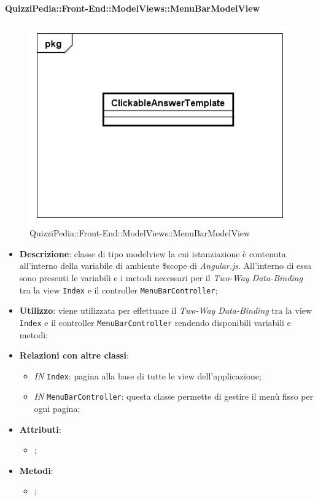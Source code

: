 \paragraph{QuizziPedia::Front-End::ModelViews::MenuBarModelView}

\label{QuizziPedia::Front-End::ModelViews::MenuBarModelView}

\begin{figure}[ht]
	\centering
	\includegraphics[scale=0.5,keepaspectratio]{UML/Classi/Front-End/QuizziPedia_Front-end_Templates_ClickableAnswerTemplate.png}
	\caption{QuizziPedia::Front-End::ModelViews::MenuBarModelView}
\end{figure} \FloatBarrier

\begin{itemize}
	\item \textbf{Descrizione}: classe di tipo modelview la cui istanziazione è contenuta all'interno della variabile di ambiente \$scope di \textit{Angular.js}. All'interno di essa sono presenti le variabili e i metodi necessari per il \textit{Two-Way Data-Binding} tra la view \texttt{Index} e il controller \texttt{MenuBarController};
	\item \textbf{Utilizzo}: viene utilizzata per effettuare il \textit{Two-Way Data-Binding} tra la view \texttt{Index} e il controller \texttt{MenuBarController} rendendo disponibili variabili e metodi;
	\item \textbf{Relazioni con altre classi}: 
	\begin{itemize}
		\item \textit{IN} \texttt{Index}: pagina alla base di tutte le view dell'applicazione; 
		\item \textit{IN} \texttt{MenuBarController}: questa classe permette di gestire il menù fisso per ogni pagina;
	\end{itemize}
	\item \textbf{Attributi}: 
	\begin{itemize}
		\item ;
	\end{itemize}
	\item \textbf{Metodi}: 
	\begin{itemize}
		\item ;
	\end{itemize}
\end{itemize}





